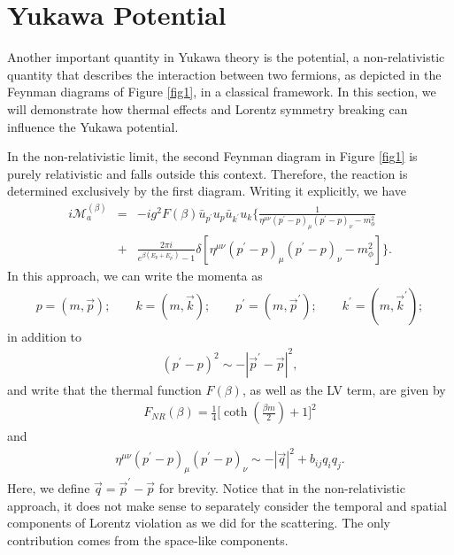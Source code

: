\documentclass[11pt,showpacs,preprintnumbers,amsmath,amssymb,prd,nofootinbib,superscriptaddress]{revtex4-2}
\begin{document}
\section{Yukawa Potential}\label{secpotential}

Another important quantity in Yukawa theory is the potential, a non-relativistic quantity that describes the interaction between two fermions, as depicted in the Feynman diagrams of Figure \ref{fig1}, in a classical framework. In this section, we will demonstrate how thermal effects and Lorentz symmetry breaking \cite{altschul} can influence the Yukawa potential.

In the non-relativistic limit, the second Feynman diagram in Figure \ref{fig1} is purely relativistic and falls outside this context. Therefore, the reaction is determined exclusively by the first diagram. Writing it explicitly, we have
\begin{eqnarray}
    i\mathcal{M}_{a}^{(\beta)}&=&-ig^2F(\beta)\bar{u}_{p^\prime}u_p\bar{u}_{k^\prime}u_k\biggl\{\frac{1}{\eta^{\mu\nu}(p^\prime-p)_\mu(p^\prime-p)_\nu-m_{\phi}^2}\nonumber\\&+&\frac{2\pi i}{e^{\beta (E_{p}+E_{p^\prime})}-1}\delta[\eta^{\mu\nu}(p^\prime-p)_\mu(p^\prime-p)_\nu-m_\phi^2]\biggr\}.
\end{eqnarray}
In this approach, we can write the momenta as
\begin{eqnarray}
    p=(m,\vec{p});\quad\quad k=(m,\vec{k});\quad\quad p^\prime=(m,\vec{p}^\prime);\quad\quad k^\prime=(m,\vec{k}^\prime);\label{eq05}
\end{eqnarray}
in addition to
\begin{eqnarray}
    (p^\prime-p)^2\sim -|\vec{p}^\prime-\vec{p}|^2,\label{eq06}
\end{eqnarray}
and write that the thermal function $F(\beta)$, as well as the LV term, are given by
\begin{eqnarray}
    F_{NR}(\beta)=\frac{1}{4}\biggr[\coth{\left(\frac{\beta m}{2}\right)}+1\biggl]^2
\end{eqnarray}
and
\begin{eqnarray}
    \eta^{\mu\nu}(p^\prime-p)_\mu(p^\prime-p)_\nu\sim -|\vec{q}|^2+b_{ij}q_iq_j.
\end{eqnarray}
Here, we define $\vec{q}=\vec{p}^\prime-\vec{p}$ for brevity. Notice that in the non-relativistic approach, it does not make sense to separately consider the temporal and spatial components of Lorentz violation as we did for the scattering. The only contribution comes from the space-like components.
\end{document}
